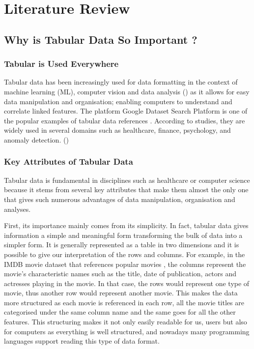 \chapter{Literature Review}


\section{Why is Tabular Data So Important ?}
\label{sec:whytabularsoimportant}

\subsection{Tabular is Used Everywhere}

Tabular data has been increasingly used for data formatting in the context of machine learning (ML), computer vision and data analysis (\cite{Lautrup2024}) as it allows for easy data manipulation and organisation; enabling computers to understand and correlate linked features. The platform Google Dataset Search Platform is one of the popular examples of tabular data references \cite{Borisov2023}. According to studies, they are widely used in several domains such as healthcare, finance, psychology, and anomaly detection. (\cite{Johnson2016, Ulmer2020, Urban2021, Guo2017, AE2022}) 

\subsection{Key Attributes of Tabular Data}

Tabular data is fundamental in disciplines such as healthcare or computer science because it stems from several key attributes that make them almost the only one that gives such numerous advantages of data manipulation, organisation and analyses. 


\vspace{0.5cm}
First, its importance mainly comes from its simplicity. In fact, tabular data gives information a simple and meaningful form transforming the bulk of data into a simpler form. It is generally represented as a table in two dimensions and it is possible to give our interpretation of the rows and columns. For example, in the IMDB movie dataset that references popular movies \cite{IMDbNonCommercial2024}, the columns represent the movie's characteristic names such as the title, date of publication, actors and actresses playing in the movie. In that case, the rows would represent one type of movie, thus another row would represent another movie. This makes the data more structured as each movie is referenced in each row, all the movie titles are categorised under the same column name and the same goes for all the other features. This structuring makes it not only easily readable for us, users but also for computers as everything is well structured, and nowadays many programming languages support reading this type of data format. 


